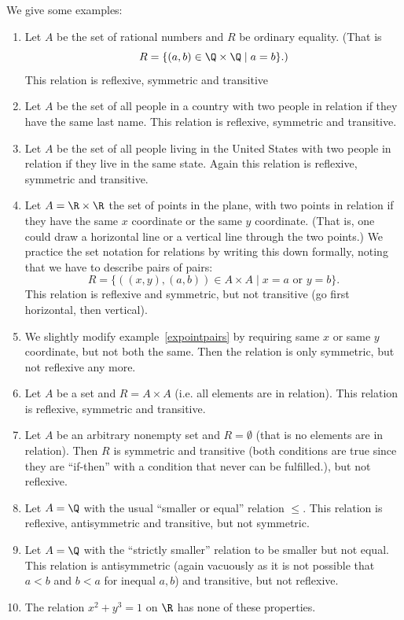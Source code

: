 We give some examples: 
\begin{enumerate}
\item
Let $A$ be the set of rational numbers and $R$ be ordinary equality. (That is 
\[
R=\{(a,b)\in\Q\times\Q\mid a=b\}.)
\]
This relation is reflexive, symmetric and transitive
\item
Let $A$ be the set of all people in a country with two people in relation if they have
the same last name. This relation is reflexive, symmetric and transitive.
\item
Let $A$ be the set of all people living in the United
States with two people in
relation if they live in the same state. Again this relation is reflexive, symmetric and
transitive.
\item
\label{expointpairs}
Let $A=\R\times\R$ the set of points in the plane, with two points in relation
if they have the same $x$ coordinate or the same $y$ coordinate. (That is, one could
draw a horizontal line or a vertical line through the two points.)
We practice the set notation for relations by writing this down formally, noting that
we have to describe pairs of pairs:
\[
R=\{((x,y),(a,b))\in A\times A\mid x=a \mbox{\ or\ }y=b\}.
\]
This relation is reflexive and symmetric, but not transitive (go first horizontal, then
vertical).
\item
We slightly modify example~\ref{expointpairs} by requiring same $x$ or same $y$
coordinate, but not both the same. Then the relation is only symmetric, but not
reflexive any more.
\item
Let $A$ be a set and $R=A\times A$ (i.e. all elements are in relation). This relation
is reflexive, symmetric and transitive.
\item
Let $A$ be an arbitrary nonempty set and $R=\emptyset$ (that is no elements
are in relation). Then $R$ is symmetric and transitive (both conditions are
true since they are ``if-then'' with a condition that
never can be fulfilled.), but not reflexive.
\item Let $A=\Q$ with the usual ``smaller or equal'' relation $\le$. This relation is
reflexive, antisymmetric and transitive, but not symmetric.
\item Let $A=\Q$ with the ``strictly smaller'' relation to be smaller but not equal. 
This relation is antisymmetric (again vacuously as it is not possible that $a<b$ and
$b<a$ for inequal $a,b$) and transitive, but not reflexive.
\item The relation $x^2+y^3=1$ on $\R$ has none of these properties.
\end{enumerate}


